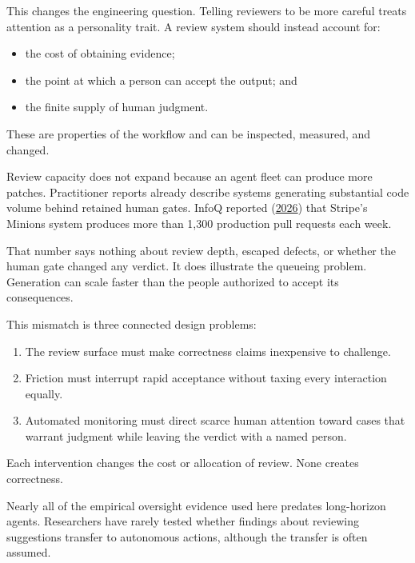 
This changes the engineering question. Telling reviewers to be more careful treats attention as a personality trait. A review system should instead account for:

\begin{itemize}
\tightlist
\item
  the cost of obtaining evidence;
\item
  the point at which a person can accept the output; and
\item
  the finite supply of human judgment.
\end{itemize}

These are properties of the workflow and can be inspected, measured, and changed.

Review capacity does not expand because an agent fleet can produce more patches. Practitioner reports already describe systems generating substantial code volume behind retained human gates. InfoQ reported (\href{https://www.infoq.com/news/2026/03/stripe-autonomous-coding-agents/}{2026}) that Stripe's Minions system produces more than 1,300 production pull requests each week.

That number says nothing about review depth, escaped defects, or whether the human gate changed any verdict. It does illustrate the queueing problem. Generation can scale faster than the people authorized to accept its consequences.


This mismatch is three connected design problems:

\begin{enumerate}
\def\labelenumi{\arabic{enumi}.}
\tightlist
\item
  The review surface must make correctness claims inexpensive to challenge.
\item
  Friction must interrupt rapid acceptance without taxing every interaction equally.
\item
  Automated monitoring must direct scarce human attention toward cases that warrant judgment while leaving the verdict with a named person.
\end{enumerate}

Each intervention changes the cost or allocation of review. None creates correctness.

Nearly all of the empirical oversight evidence used here predates long-horizon agents. Researchers have rarely tested whether findings about reviewing suggestions transfer to autonomous actions, although the transfer is often assumed.

